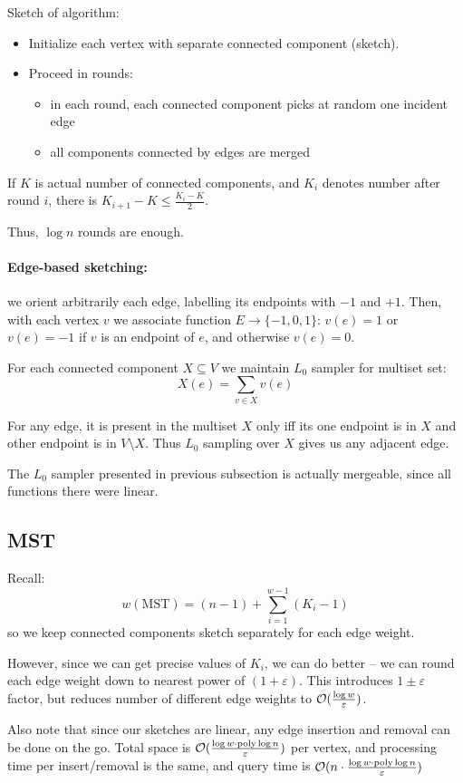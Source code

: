 \documentclass[11pt]{article}
\begin{document}
Sketch of algorithm:
\begin{itemize}
\item Initialize each vertex with separate connected component (sketch).
\item Proceed in rounds: 
\begin{itemize}
\item in each round, each connected component picks at random one incident edge
\item all components connected by edges are merged
\end{itemize}
\end{itemize}

\begin{lemma}
If $K$ is actual number of connected components, and $K_i$ denotes number after round $i$, there is $K_{i+1} - K \le \frac{K_i - K}{2}$.
\end{lemma}
Thus, $\log n$ rounds are enough.

\paragraph{Edge-based sketching:} we orient arbitrarily each edge, labelling its endpoints with $-1$ and $+1$.
Then, with each vertex $v$ we associate function $E \to \{-1,0,1\}$: $v(e) = 1$ or $v(e) = -1$ if $v$ is an endpoint of $e$, and otherwise $v(e) = 0$.

For each connected component $X \subseteq V$ we maintain $L_0$ sampler for multiset set:
$$X(e) = \sum_{v \in X} v(e)$$

For any edge, it is present in the multiset $X$ only iff its one endpoint is in $X$ and other endpoint is in $V \setminus X$. Thus $L_0$ sampling over $X$ gives us any adjacent edge.

The $L_0$ sampler presented in previous subsection is actually mergeable, since all functions there were linear.

\subsection{MST}
Recall: 
$$w(\text{MST}) = (n-1) + \sum_{i=1}^{w-1} (K_i - 1)$$
so we keep connected components sketch separately for each edge weight.

However, since we can get precise values of $K_i$, we can do better -- we can round each edge weight down to nearest power of $(1+\varepsilon)$. This introduces $1 \pm \varepsilon$ factor, but reduces number of different edge weights to $\mathcal{O}(\frac{\log w}{\varepsilon})$.

Also note that since our sketches are linear, any edge insertion and removal can be done on the go. Total space is $\mathcal{O}(\frac{\log w \cdot \text{poly} \log n}{\varepsilon})$ per vertex, and processing time per insert/removal is the same, and query time is $\mathcal{O}(n \cdot \frac{\log w \cdot \text{poly} \log n}{\varepsilon})$ 



\end{document}
